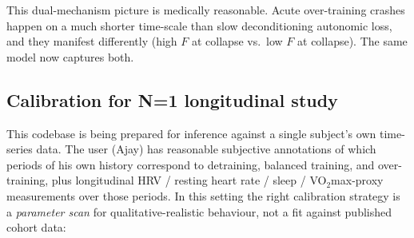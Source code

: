 This dual-mechanism picture is medically reasonable. Acute over-training crashes happen on a much shorter time-scale than slow deconditioning autonomic loss, and they manifest differently (high $F$ at collapse vs.\ low $F$ at collapse). The same model now captures both.

\subsection{Calibration for N=1 longitudinal study}

This codebase is being prepared for inference against a single subject's own time-series data. The user (Ajay) has reasonable subjective annotations of which periods of his own history correspond to detraining, balanced training, and over-training, plus longitudinal HRV / resting heart rate / sleep / VO$_2$max-proxy measurements over those periods. In this setting the right calibration strategy is a \emph{parameter scan} for qualitative-realistic behaviour, not a fit against published cohort data:


